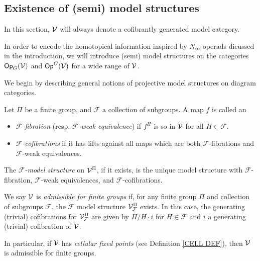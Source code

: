 \documentclass[a4paper,10pt]{article}%
\begin{document}
 
\subsection{Existence of (semi) model structures} 
\label{EXISTENCE_SECTION}

In this section, $\mathcal V$ will always denote a cofibrantly generated model category. 

\renewcommand{\F}{\ensuremath{\mathcal F}} 
\renewcommand{\labelenumi}{\theenumi}
\renewcommand{\theenumi}{\roman{enumi}}%

In order to encode the homotopical information inspired by $N_\infty$-operads dicussed in the introduction, we will introduce (semi) model structures on the categories $\mathsf{Op}_G(\mathcal V)$ and $\mathsf{Op}^G(\mathcal V)$ for a wide range of $\mathcal V$. 

We begin by describing general notions of projective model structures on diagram categories.

\begin{definition}
        Let $\Pi$ be a finite group, and $\F$ a collection of subgroups. 
        A map $f$ is called an 
        \begin{itemize}
        \item \textit{$\F$-fibration} (resp. \textit{$\F$-weak equivalence}) if $f^H$ is so in $\mathcal V$ for all $H\in \F$.
        \item \textit{$\F$-cofibrations} if it has lifts against all maps which are both $\F$-fibrations and $\F$-weak equivalences. 
        \end{itemize}
        The \textit{$\F$-model structure} on $\mathcal V^\Pi$, if it exists, is the unique model structure with $\F$-fibration, $\F$-weak equivalences, and $\F$-cofibrations.
\end{definition}

\begin{definition}
        We say $\mathcal V$ is \textit{admissible for finite groups} if, 
        for any finite group $\Pi$ and collection of subgroups $\F$, 
        the $\F$ model structure $\V^\Pi_\F$ exists.
        In this case, the generating (trivial) cofibrations for $\V^\Pi_{\F}$ are given by 
        $\Pi/H \cdot i$
        for $H\in \F$ and $i$ a generating (trivial) cofibration of $\mathcal V$.
\end{definition}

In particular, if $\mathcal V$ has \textit{cellular fixed points} (see Definition \ref{CELL DEF}), then $\mathcal V$ is admissible for finite groups. 
\end{document}
